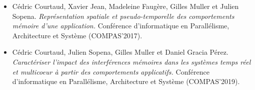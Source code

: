 \begin{itemize}
	\item Cédric Courtaud, Xavier Jean, Madeleine Faugère, Gilles Muller et Julien Sopena. \textit{Représentation spatiale et pseudo-temporelle des comportements mémoire d'une application.} Conférence d’informatique en Parallélisme, Architecture et Système (COMPAS'2017).

	\item Cédric Courtaud, Julien Sopena, Gilles Muller et Daniel Gracia Pérez. \textit{Caractériser l’impact des interférences mémoires dans les systèmes temps réel et multicoeur à partir des comportements applicatifs.} Conférence d’informatique en Parallélisme, Architecture et Système (COMPAS'2019). 
\end{itemize}